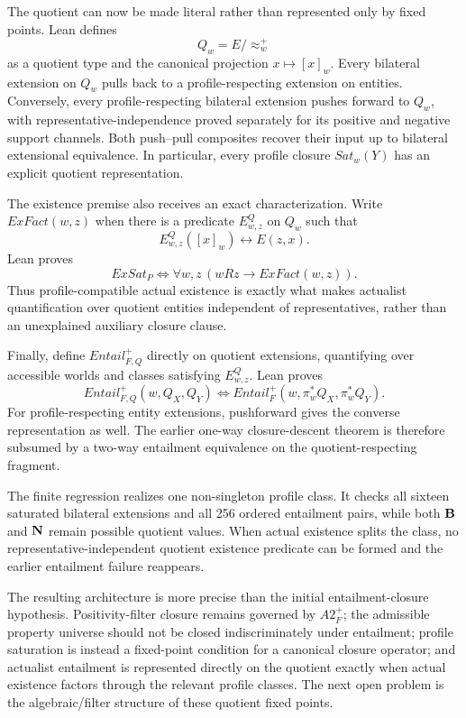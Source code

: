 The quotient can now be made literal rather than represented only by fixed points. Lean defines
\[
  Q_w=E/{\approx_w^+}
\]
as a quotient type and the canonical projection \(x\mapsto[x]_w\). Every bilateral extension on \(Q_w\) pulls back to a profile-respecting extension on entities. Conversely, every profile-respecting bilateral extension pushes forward to \(Q_w\), with representative-independence proved separately for its positive and negative support channels. Both push--pull composites recover their input up to bilateral extensional equivalence. In particular, every profile closure \(Sat_w(Y)\) has an explicit quotient representation.

The existence premise also receives an exact characterization. Write \(ExFact(w,z)\) when there is a predicate \(E^Q_{w,z}\) on \(Q_w\) such that
\[
  E^Q_{w,z}([x]_w)\leftrightarrow E(z,x).
\]
Lean proves
\[
\boxed{
  ExSat_P
  \Longleftrightarrow
  \forall w,z\,(wRz\rightarrow ExFact(w,z)).
}
\]
Thus profile-compatible actual existence is exactly what makes actualist quantification over quotient entities independent of representatives, rather than an unexplained auxiliary closure clause.

Finally, define \(Entail_{F,Q}^+\) directly on quotient extensions, quantifying over accessible worlds and classes satisfying \(E^Q_{w,z}\). Lean proves
\[
\boxed{
  Entail_{F,Q}^+(w,Q_X,Q_Y)
  \Longleftrightarrow
  Entail_F^+(w,\pi_w^*Q_X,\pi_w^*Q_Y).
}
\]
For profile-respecting entity extensions, pushforward gives the converse representation as well. The earlier one-way closure-descent theorem is therefore subsumed by a two-way entailment equivalence on the quotient-respecting fragment.

The finite regression realizes one non-singleton profile class. It checks all sixteen saturated bilateral extensions and all 256 ordered entailment pairs, while both \(\mathbf{B}\) and \(\mathbf{N}\) remain possible quotient values. When actual existence splits the class, no representative-independent quotient existence predicate can be formed and the earlier entailment failure reappears.

The resulting architecture is more precise than the initial entailment-closure hypothesis. Positivity-filter closure remains governed by \(A2_F^+\); the admissible property universe should not be closed indiscriminately under entailment; profile saturation is instead a fixed-point condition for a canonical closure operator; and actualist entailment is represented directly on the quotient exactly when actual existence factors through the relevant profile classes. The next open problem is the algebraic/filter structure of these quotient fixed points.


